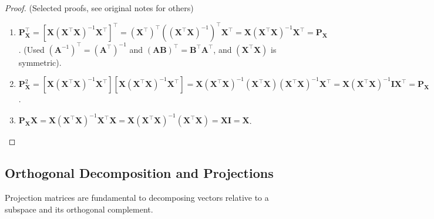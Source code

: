 \documentclass[11pt, letterpaper]{article}
\theoremstyle{definition}
\newcommand{\mat}[1]{\mathbf{#1}} %
\begin{document}
\begin{proof} (Selected proofs, see original notes for others)
\begin{enumerate}
    \item $\mat{P}_{\mat{X}}^{\top} = [\mat{X}(\mat{X}^{\top}\mat{X})^{-1}\mat{X}^{\top}]^{\top} = (\mat{X}^{\top})^{\top} ((\mat{X}^{\top}\mat{X})^{-1})^{\top} \mat{X}^{\top} = \mat{X} (\mat{X}^{\top}\mat{X})^{-1} \mat{X}^{\top} = \mat{P}_{\mat{X}}$. (Used $(\mat{A}^{-1})^{\top} = (\mat{A}^{\top})^{-1}$ and $(\mat{A}\mat{B})^{\top} = \mat{B}^{\top}\mat{A}^{\top}$, and $(\mat{X}^{\top}\mat{X})$ is symmetric).
    \item $\mat{P}_{\mat{X}}^2 = [\mat{X}(\mat{X}^{\top}\mat{X})^{-1}\mat{X}^{\top}] [\mat{X}(\mat{X}^{\top}\mat{X})^{-1}\mat{X}^{\top}] = \mat{X}(\mat{X}^{\top}\mat{X})^{-1} (\mat{X}^{\top}\mat{X}) (\mat{X}^{\top}\mat{X})^{-1}\mat{X}^{\top} = \mat{X}(\mat{X}^{\top}\mat{X})^{-1}\mat{I}\mat{X}^{\top} = \mat{P}_{\mat{X}}$.
    \item $\mat{P}_{\mat{X}}\mat{X} = \mat{X}(\mat{X}^{\top}\mat{X})^{-1}\mat{X}^{\top}\mat{X} = \mat{X}(\mat{X}^{\top}\mat{X})^{-1}(\mat{X}^{\top}\mat{X}) = \mat{X}\mat{I} = \mat{X}$.
\end{enumerate}
\end{proof}

\subsection{Orthogonal Decomposition and Projections}

Projection matrices are fundamental to decomposing vectors relative to a subspace and its orthogonal complement.
\end{document}
